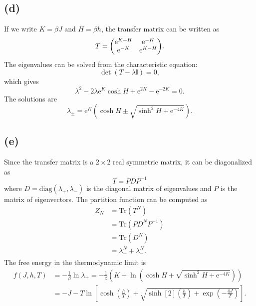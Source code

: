\documentclass{article}
\newcommand{\me}{\mathrm{e}}
\begin{document}
\subsection*{(d)}
If we write $K=\beta J$ and $H=\beta h$, the transfer matrix can be written as
\begin{equation}
    T=\mqty(
        \me^{K+H} & \me^{-K}\\
        \me^{-K} & \me^{K-H}
    ).
\end{equation}
The eigenvalues can be solved from the characteristic equation:
\begin{equation}
    \det(T-\lambda \mathbb{I})=0,
\end{equation}
which gives
\begin{equation}
    \lambda^2 -2\lambda \me^{K}\cosh{H}+\me^{2K}-\me^{-2K}=0.
\end{equation}
The solutions are
\begin{equation}
    \lambda_{\pm}=\me^{K}\left(\cosh{H}\pm\sqrt{\sinh^2{H}+\me^{-4K}}\right).
\end{equation}

\subsection*{(e)}
Since the transfer matrix is a $2\times 2$ real symmetric matrix, it can be diagonalized as
\begin{equation}
    T=PDP^{-1}
\end{equation}
where $D=\text{diag}(\lambda_+,\lambda_-)$ is the diagonal matrix of eigenvalues and $P$ is the matrix of eigenvectors.
The partition function can be computed as
\begin{equation}
    \begin{split}
        Z_N&=\text{Tr}(T^N)\\
           &=\text{Tr}(PD^N P^{-1})\\
           &=\text{Tr}(D^N)\\
           &=\lambda_+^N+\lambda_-^N.
    \end{split}
\end{equation}
The free energy in the thermodynamic limit is
\begin{equation}
    \begin{split}
        f(J,h,T)&=-\frac{1}{\beta}\ln{\lambda_+}=-\frac{1}{\beta}\left(K+\ln\left(\cosh{H}+\sqrt{\sinh^2{H}+\me^{-4K}}\right)\right)\\
                &=-J-T\ln\left[\cosh(\frac{h}{T})+\sqrt{\sinh[2](\frac{h}{T})+\exp(-\frac{4J}{T})}\right].
    \end{split}
\end{equation}
\end{document}
